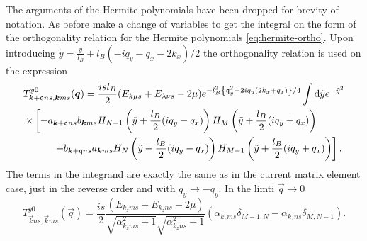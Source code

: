 The arguments of the Hermite polynomials have been dropped for brevity of notation.
As before make a change of variables to get the integral on the form of the orthogonality relation for the Hermite polynomials \cref{eq:hermite-ortho}.
Upon introducing $\tilde{y} = \frac{y}{l_{B}} + l_B( -iq_y - q_x - 2k_x) / 2$ the orthogonality relation is used on the expression
{\setlength\multlinegap{0pt}  %
\begin{multline}
  \label{eq:76}
    T^{y 0}_{\vec{k}+\qvec{q}ns, \vec{k}ms} (\vec{q})
    = \frac{i s l_B}{2}
    (E_{k \mu s} + E_{\lambda \nu s}- 2\mu )
   e^{
      -l_B^2 \left\{ \qvec{q}_y^2- 2 i q_y (2 k_x + q_x) \right\} /4
    }
    \int \mathrm{d}\tilde{y} e^{-\tilde{y}^2}\\
    \times \begin{multlined}[t]
      \left[
        - a_{\vec{k}+\qvec{q} ns} b_{\vec{k} ms}
        H_{N-1} \left( \tilde{y} + \frac{l_B}{2} ( iq_y - q_x) \right)
        H_M \left( \tilde{y} + \frac{l_B}{2} (iq_y + q_x) \right)\right.\\
      \left.\quad + b_{\vec{k}+\qvec{q} ns} a_{\vec{k}ms}
        H_N \left( \tilde{y} + \frac{l_B}{2} ( iq_y - q_x) \right)
        H_{M-1} \left( \tilde{y} + \frac{l_B}{2} (iq_y + q_x) \right)
      \right].
    \end{multlined}
  \end{multline}
}%
The terms in the integrand are exactly the same as in the current matrix element case, just in the reverse order and with $q_y \to -q_y$.
In the limti \( \vec{q} \to 0 \)
\begin{equation}
  \label{eq:77}
  T^{y 0}_{\vec{k} ns, \vec{k}ms} (\vec{q})
  = \frac{i s}{2}
  \frac{
    (E_{k_z m s} + E_{k_z n s}- 2\mu )
  }{
    \sqrt{\alpha_{k_zms}^2 +1}
    \sqrt{\alpha_{k_zns}^2 + 1}
  }
  \left(
    \alpha_{k_z m s}
    \delta_{M-1, N}
    -
    \alpha_{k_z n s}
    \delta_{M, N-1}
  \right).
\end{equation}

